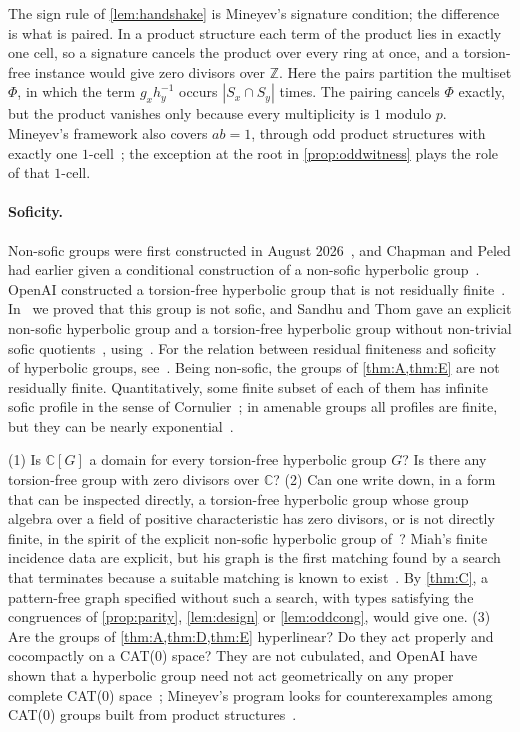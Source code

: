 \documentclass[11pt]{article}
\theoremstyle{definition}
\theoremstyle{plain}
\newcommand{\Z}{\mathbb{Z}}
\newcommand{\C}{\mathbb{C}}
\begin{document}
The sign rule of \cref{lem:handshake} is Mineyev's signature condition; the difference is what is paired. In a product structure each term of the product lies in exactly one cell, so a signature cancels the product over every ring at once, and a torsion-free instance would give zero divisors over $\Z$. Here the pairs partition the multiset $\Phi$, in which the term $g_xh_y^{-1}$ occurs $|S_x\cap S_y|$ times. The pairing cancels $\Phi$ exactly, but the product vanishes only because every multiplicity is $1$ modulo $p$. Mineyev's framework also covers $ab=1$, through odd product structures with exactly one $1$-cell~\cite[\S\S2.1 and~2.3]{Mineyev2024}; the exception at the root in \cref{prop:oddwitness} plays the role of that $1$-cell.

\paragraph{Soficity.} Non-sofic groups were first constructed in August 2026~\cite{OAIten,FournierFacio2026,KunThom2026}, and Chapman and Peled had earlier given a conditional construction of a non-sofic hyperbolic group~\cite{ChapmanPeled2025}. OpenAI constructed a torsion-free hyperbolic group that is not residually finite~\cite{OAI252}. In~\cite{DouglasMghirbi2026} we proved that this group is not sofic, and Sandhu and Thom gave an explicit non-sofic hyperbolic group and a torsion-free hyperbolic group without non-trivial sofic quotients~\cite{SandhuThom2026}, using~\cite{KapovichWise2000}. For the relation between residual finiteness and soficity of hyperbolic groups, see~\cite[Conj.~2.8]{Arzhantseva2014}. Being non-sofic, the groups of \cref{thm:A,thm:E} are not residually finite. Quantitatively, some finite subset of each of them has infinite sofic profile in the sense of Cornulier~\cite{Cornulier2013}; in amenable groups all profiles are finite, but they can be nearly exponential~\cite{DouglasMghirbiProfile2026}.

\begin{question}
(1) Is $\C[G]$ a domain for every torsion-free hyperbolic group $G$? Is there any torsion-free group with zero divisors over $\C$? (2) Can one write down, in a form that can be inspected directly, a torsion-free hyperbolic group whose group algebra over a field of positive characteristic has zero divisors, or is not directly finite, in the spirit of the explicit non-sofic hyperbolic group of~\cite{SandhuThom2026}? Miah's finite incidence data are explicit, but his graph is the first matching found by a search that terminates because a suitable matching is known to exist~\cite[\S\S1 and~8]{Miah2026}. By \cref{thm:C}, a pattern-free graph specified without such a search, with types satisfying the congruences of \cref{prop:parity}, \cref{lem:design} or \cref{lem:oddcong}, would give one. (3) Are the groups of \cref{thm:A,thm:D,thm:E} hyperlinear? Do they act properly and cocompactly on a CAT(0) space? They are not cubulated, and OpenAI have shown that a hyperbolic group need not act geometrically on any proper complete CAT(0) space~\cite[Thm.~1.1]{OAI257}; Mineyev's program looks for counterexamples among CAT(0) groups built from product structures~\cite{Mineyev2024,GargMineyev2025}.
\end{question}
\end{document}
